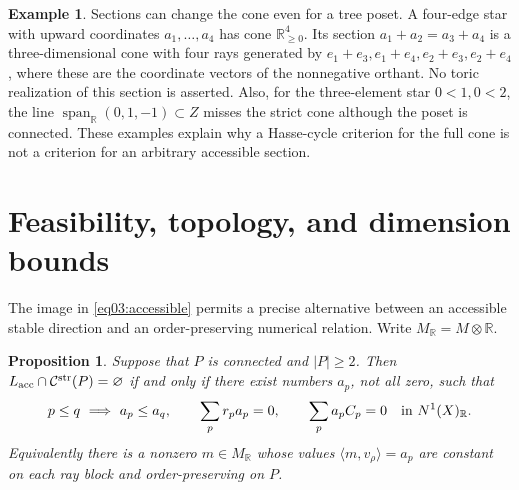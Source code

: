 \documentclass[11pt]{amsart}
\newtheorem{proposition}[theorem]{Proposition}
\theoremstyle{definition}
\newtheorem{example}[theorem]{Example}
\theoremstyle{remark}
\newcommand{\RR}{\mathbb R}
\newcommand{\cC}{\mathcal C}
\newcommand{\spanR}{\operatorname{span}_{\RR}}
\begin{document}
\begin{example}\label{ex03:section}
Sections can change the cone even for a tree poset. A four-edge star
with upward coordinates \(a_1,\ldots,a_4\) has cone
\(\RR_{\ge0}^4\). Its section
\(a_1+a_2=a_3+a_4\) is a three-dimensional cone with four rays
generated by \(e_1+e_3,e_1+e_4,e_2+e_3,e_2+e_4\), where these
are the coordinate vectors of the nonnegative orthant. No toric realization
of this section is asserted. Also, for the three-element star
\(0<1,0<2\), the line \(\spanR(0,1,-1)\subset Z\) misses the
strict cone although the poset is connected. These examples explain
why a Hasse-cycle criterion for the full cone is not a criterion for
an arbitrary accessible section.
\end{example}

\section{Feasibility, topology, and dimension bounds}\label{sec04:topology}

The image in \eqref{eq03:accessible} permits a precise alternative
between an accessible stable direction and an order-preserving
numerical relation. Write \(M_\RR=M\otimes\RR\).

\begin{proposition}\label{prop04:character}
Suppose that \(P\) is connected and \(|P|\ge2\). Then
\(L_{\rm acc}\cap\cC^{\rm str}(P)=\varnothing\) if and only if
there exist numbers \(a_p\), not all zero, such that
\begin{equation}\label{eq04:character}
 p\le q\ \Longrightarrow\ a_p\le a_q,\qquad
 \sum_pr_pa_p=0,\qquad \sum_pa_pC_p=0\quad\hbox{in }N^1(X)_\RR.
\end{equation}
Equivalently there is a nonzero \(m\in M_\RR\) whose values
\(\langle m,v_\rho\rangle=a_p\) are constant on each ray block
and order-preserving on \(P\).
\end{proposition}
\end{document}

